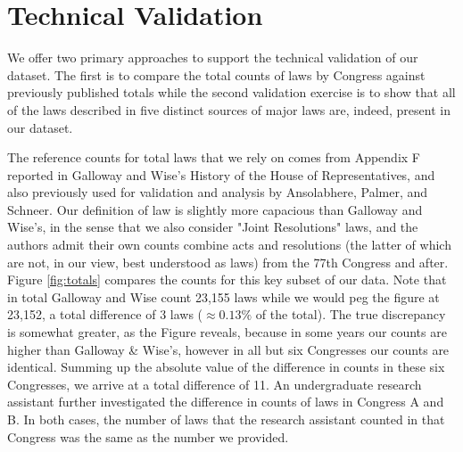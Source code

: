 \documentclass[fleqn,10pt]{wlscirep}
\begin{document}

\section*{Technical Validation}


We offer two primary approaches to support the technical validation of our dataset. The first is to compare the total counts of laws by Congress against previously published totals while the second validation exercise is to show that all of the laws described in five distinct sources of major laws are, indeed, present in our dataset.

The reference counts for total laws that we rely on comes from Appendix F reported in Galloway and Wise's History of the House of Representatives\nocite{gallowaywise}, and also previously used for validation and analysis by Ansolabhere, Palmer, and Schneer.\cite{ansolabehere_palmer_schneer_2016} Our definition of law is slightly more capacious than Galloway and Wise's, in the sense that we also consider "Joint Resolutions" laws, and the authors admit their own counts combine acts and resolutions (the latter of which are not, in our view, best understood as laws) from the 77th Congress and after. Figure \ref{fig:totals} compares the counts for this key subset of our data. Note that in total Galloway and Wise count 23,155 laws while we would peg the figure at 23,152, a total difference of 3 laws ($\approx 0.13\%$ of the total). The true discrepancy is somewhat greater, as the Figure reveals, because in some years our counts are higher than Galloway \& Wise's, however in all but six Congresses our counts are identical. Summing up the absolute value of the difference in counts in these six Congresses, we arrive at a total difference of 11. An undergraduate research assistant further investigated the difference in counts of laws in Congress A and B. In both cases, the number of laws that the research assistant counted in that Congress was the same as the number we provided. 
\end{document}
